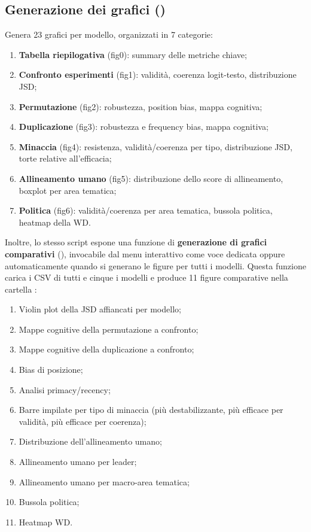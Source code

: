 \documentclass[../relazione.tex]{subfiles}
\begin{document}
\subsection{Generazione dei grafici (\protect{})}
Genera 23 grafici per modello, organizzati in 7 categorie:
\begin{enumerate}
    \item \textbf{Tabella riepilogativa} (fig0): summary delle metriche chiave;
    \item \textbf{Confronto esperimenti} (fig1): validità, coerenza logit-testo, distribuzione JSD;
    \item \textbf{Permutazione} (fig2): robustezza, position bias, mappa cognitiva;
    \item \textbf{Duplicazione} (fig3): robustezza e frequency bias, mappa cognitiva;
    \item \textbf{Minaccia} (fig4): resistenza, validità/coerenza per tipo, distribuzione JSD, torte relative all'efficacia;
    \item \textbf{Allineamento umano} (fig5): distribuzione dello score di allineamento, boxplot per area tematica;
    \item \textbf{Politica} (fig6): validità/coerenza per area tematica, bussola politica, heatmap della WD.
\end{enumerate}

Inoltre, lo stesso script espone una funzione di \textbf{generazione di grafici comparativi} (), invocabile dal menu interattivo come voce dedicata oppure automaticamente quando si generano le figure per tutti i modelli. Questa funzione carica i CSV di tutti e cinque i modelli e produce 11 figure comparative nella cartella :
\begin{enumerate}
    \item Violin plot della JSD affiancati per modello;
    \item Mappe cognitive della permutazione a confronto;
    \item Mappe cognitive della duplicazione a confronto;
    \item Bias di posizione;
    \item Analisi primacy/recency;
    \item Barre impilate per tipo di minaccia (più destabilizzante, più efficace per validità, più efficace per coerenza);
    \item Distribuzione dell'allineamento umano;
    \item Allineamento umano per leader;
    \item Allineamento umano per macro-area tematica;
    \item Bussola politica;
    \item Heatmap WD.
\end{enumerate}
\end{document}
